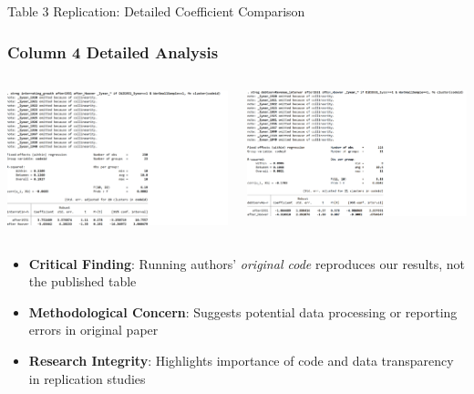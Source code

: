 \documentclass{beamer}
\begin{document}
\begin{frame}{Table 3 Replication: Detailed Coefficient Comparison}
  \frametitle{Column 4 Detailed Analysis}
  \begin{columns}
    \begin{column}{0.5\textwidth}
      \centering
      \includegraphics[width=0.95\linewidth]{figures/col3_tab3_stata.png}
      \label{fig:table3_col3}
    \end{column}
    \begin{column}{0.5\textwidth}
      \centering
      \includegraphics[width=0.95\linewidth]{figures/col4_tab3_stata.png}
      \label{fig:table3_col4}
    \end{column}
  \end{columns}
  
  \vspace{0.5cm}
  \begin{itemize}
    \item \textbf{Critical Finding}: Running authors' \textit{original code} reproduces our results, not the published table
    \item \textbf{Methodological Concern}: Suggests potential data processing or reporting errors in original paper
    \item \textbf{Research Integrity}: Highlights importance of code and data transparency in replication studies
  \end{itemize}
\end{frame}
\end{document}
